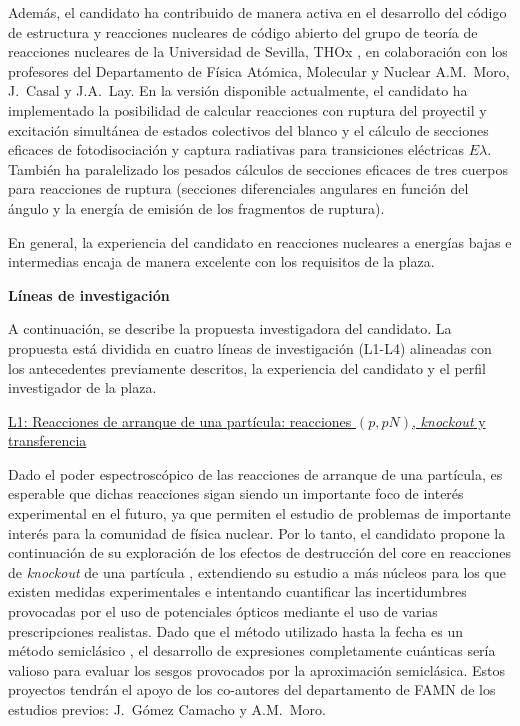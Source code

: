 \documentclass[a4paper,12pt,twoside]{article}
\begin{document}
Además, el candidato ha contribuido de manera activa en el desarrollo del código de estructura y reacciones nucleares de código abierto del grupo de teoría de reacciones nucleares de la Universidad de Sevilla, THOx \cite{thox}, en colaboración con los profesores del Departamento de Física Atómica, Molecular y Nuclear A.M.~Moro, J.~Casal y J.A.~Lay. En la versión disponible actualmente, el candidato ha implementado la posibilidad de calcular reacciones con ruptura del proyectil y excitación simultánea de estados colectivos del blanco \cite{texc} y el cálculo de secciones eficaces de fotodisociación y captura radiativas para transiciones eléctricas $E\lambda$. También ha paralelizado los pesados cálculos de secciones eficaces de tres cuerpos para reacciones de ruptura (secciones diferenciales angulares en función del ángulo y la energía de emisión de los fragmentos de ruptura).

En general, la experiencia del candidato en reacciones nucleares a energías bajas e intermedias encaja de manera excelente con los requisitos de la plaza.

\textbf{Líneas de investigación}

A continuación, se describe la propuesta investigadora del candidato. La propuesta
está dividida en cuatro líneas de investigación (L1-L4) alineadas con los antecedentes previamente descritos, la experiencia del candidato y el perfil investigador de la plaza.

\underline{L1: Reacciones de arranque de una partícula: reacciones $(p,pN)$, \textit{knockout} y transferencia}

Dado el poder espectroscópico de las reacciones de arranque de una partícula, es esperable que dichas reacciones sigan siendo un importante foco de interés experimental en el futuro, ya que permiten el estudio de problemas de importante interés para la comunidad de física nuclear. Por lo tanto, el candidato propone la continuación de su exploración de los efectos de destrucción del core en reacciones de \textit{knockout} de una partícula \cite{quenching}, extendiendo su estudio a más núcleos para los que existen medidas experimentales \cite{Tos21} e intentando cuantificar las incertidumbres provocadas por el uso de potenciales ópticos mediante el uso de varias prescripciones realistas. Dado que el método utilizado hasta la fecha es un método semiclásico \cite{quenching}, el desarrollo de expresiones completamente cuánticas sería valioso para evaluar los sesgos provocados por la aproximación semiclásica. Estos proyectos tendrán el apoyo de los co-autores del departamento de FAMN de los estudios previos: J.~Gómez Camacho y A.M.~Moro.
\end{document}
